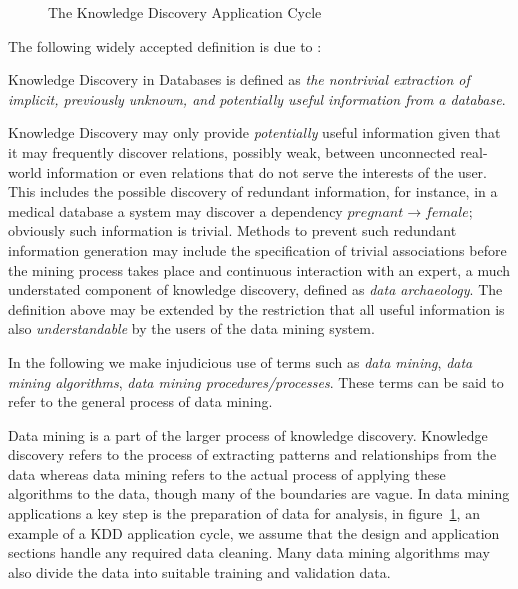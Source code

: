  
\begin{figure}
\centerline{}
\caption{\label{fig:kd_process}The Knowledge Discovery
Application Cycle}
\end{figure}

The following widely accepted definition is due to \cite{kdd96}:

\begin{definition}
\begin{rm} Knowledge Discovery in Databases is defined as {\em the nontrivial extraction of implicit, previously unknown, and potentially useful information from a database}.   
\end{rm}
\end{definition}

Knowledge Discovery may only provide {\em potentially} useful
information given that it may frequently discover relations, possibly
weak, between unconnected real-world information or even relations
that do not serve the interests of the user.  This includes the
possible discovery of redundant information, for instance, in a
medical database a system may discover a dependency $pregnant
\rightarrow female$; obviously such information is trivial.  Methods
to prevent such redundant information generation may include the
specification of trivial associations before the mining process takes
place and continuous interaction with an expert, a much understated
component of knowledge discovery, defined as {\em data
archaeology}. The definition above may be extended by the restriction
that all useful information is also {\em understandable} by the users
of the data mining system. 

\medskip
In the following we make injudicious use of terms such as {\em data
mining}, {\em data mining algorithms}, {\em data mining
procedures/processes}. These terms can be said to refer to the general
process of data mining.

\medskip

Data mining is a part of the larger process of knowledge discovery.  Knowledge
discovery refers to the process of extracting patterns and relationships 
from the data whereas data mining refers to the actual process of applying
these algorithms to the data, though many of the boundaries are vague.
In data mining applications a key step is 
the preparation of data for analysis, in figure~\ref{fig:kd_process},
an example of a KDD application cycle, we assume that the
design and application sections handle any required data
cleaning. Many data mining algorithms may also divide the data into suitable training and validation data.\\


